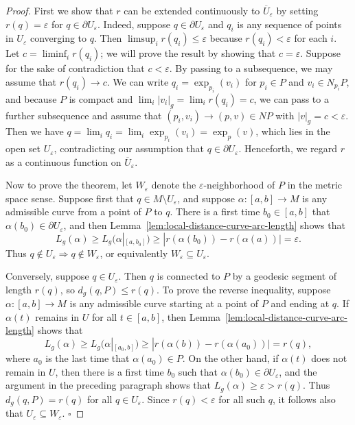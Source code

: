 \begin{proof}
First we show that $r$ can be extended continuously to $\overline{U}_\varepsilon$ by setting $r(q) = \varepsilon$ for $q \in \partial U_\varepsilon$. Indeed, suppose $q \in \partial U_\varepsilon$ and $q_i$ is any sequence of points in $U_\varepsilon$ converging to $q$. Then $\limsup_i r(q_i) \le \varepsilon$ because $r(q_i) < \varepsilon$ for each $i$. Let $c = \liminf_i r(q_i)$; we will prove the result by showing that $c = \varepsilon$. Suppose for the sake of contradiction that $c < \varepsilon$. By passing to a subsequence, we may assume that $r(q_i) \to c$. We can write $q_i = \exp_{p_i}(v_i)$ for $p_i \in P$ and $v_i \in N_{p_i} P$, and because $P$ is compact and $\lim_i |v_i|_g = \lim_i r(q_i) = c$, we can pass to a further subsequence and assume that $(p_i, v_i) \to (p, v) \in NP$ with $|v|_g = c < \varepsilon$. Then we have $q = \lim_i q_i = \lim_i \exp_{p_i}(v_i) = \exp_p(v)$, which lies in the open set $U_\varepsilon$, contradicting our assumption that $q \in \partial U_\varepsilon$. Henceforth, we regard $r$ as a continuous function on $\overline{U}_\varepsilon$.

Now to prove the theorem, let $W_\varepsilon$ denote the $\varepsilon$-neighborhood of $P$ in the metric space sense. Suppose first that $q \in M \setminus U_\varepsilon$, and suppose $\alpha: [a, b] \to M$ is any admissible curve from a point of $P$ to $q$. There is a first time $b_0 \in [a, b]$ that $\alpha(b_0) \in \partial U_\varepsilon$, and then Lemma~\ref{lem:local-distance-curve-arc-length} shows that
\[
L_g(\alpha) \ge L_g(\alpha|_{[a,b_0]}) \ge |r(\alpha(b_0)) - r(\alpha(a))| = \varepsilon.
\]
Thus $q \notin U_\varepsilon \Rightarrow q \notin W_\varepsilon$, or equivalently $W_\varepsilon \subseteq U_\varepsilon$.

Conversely, suppose $q \in U_\varepsilon$. Then $q$ is connected to $P$ by a geodesic segment of length $r(q)$, so $d_g(q, P) \le r(q)$. To prove the reverse inequality, suppose $\alpha: [a, b] \to M$ is any admissible curve starting at a point of $P$ and ending at $q$. If $\alpha(t)$ remains in $U$ for all $t \in [a, b]$, then Lemma~\ref{lem:local-distance-curve-arc-length} shows that
\[
L_g(\alpha) \ge L_g(\alpha|_{[a_0,b]}) \ge |r(\alpha(b)) - r(\alpha(a_0))| = r(q),
\]
where $a_0$ is the last time that $\alpha(a_0) \in P$. On the other hand, if $\alpha(t)$ does not remain in $U$, then there is a first time $b_0$ such that $\alpha(b_0) \in \partial U_\varepsilon$, and the argument in the preceding paragraph shows that $L_g(\alpha) \ge \varepsilon > r(q)$. Thus $d_g(q, P) = r(q)$ for all $q \in U_\varepsilon$. Since $r(q) < \varepsilon$ for all such $q$, it follows also that $U_\varepsilon \subseteq W_\varepsilon$. $\square$
\end{proof}

